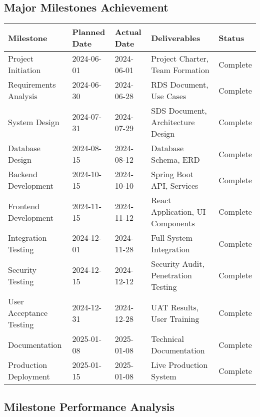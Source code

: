 \documentclass[12pt,a4paper]{article}
\begin{document}
\subsection{Major Milestones Achievement}
\begin{longtable}{|p{3cm}|p{2.5cm}|p{2.5cm}|p{3cm}|p{2cm}|}
\hline
\rowcolor{lightgray}
\textbf{Milestone} & \textbf{Planned Date} & \textbf{Actual Date} & \textbf{Deliverables} & \textbf{Status} \\
\hline
Project Initiation & 2024-06-01 & 2024-06-01 & Project Charter, Team Formation & \cellcolor{completedgreen}Complete \\
\hline
Requirements Analysis & 2024-06-30 & 2024-06-28 & RDS Document, Use Cases & \cellcolor{completedgreen}Complete \\
\hline
System Design & 2024-07-31 & 2024-07-29 & SDS Document, Architecture Design & \cellcolor{completedgreen}Complete \\
\hline
Database Design & 2024-08-15 & 2024-08-12 & Database Schema, ERD & \cellcolor{completedgreen}Complete \\
\hline
Backend Development & 2024-10-15 & 2024-10-10 & Spring Boot API, Services & \cellcolor{completedgreen}Complete \\
\hline
Frontend Development & 2024-11-15 & 2024-11-12 & React Application, UI Components & \cellcolor{completedgreen}Complete \\
\hline
Integration Testing & 2024-12-01 & 2024-11-28 & Full System Integration & \cellcolor{completedgreen}Complete \\
\hline
Security Testing & 2024-12-15 & 2024-12-12 & Security Audit, Penetration Testing & \cellcolor{completedgreen}Complete \\
\hline
User Acceptance Testing & 2024-12-31 & 2024-12-28 & UAT Results, User Training & \cellcolor{completedgreen}Complete \\
\hline
Documentation & 2025-01-08 & 2025-01-08 & Technical Documentation & \cellcolor{completedgreen}Complete \\
\hline
Production Deployment & 2025-01-15 & 2025-01-08 & Live Production System & \cellcolor{completedgreen}Complete \\
\hline
\end{longtable}

\subsection{Milestone Performance Analysis}
\end{document}
